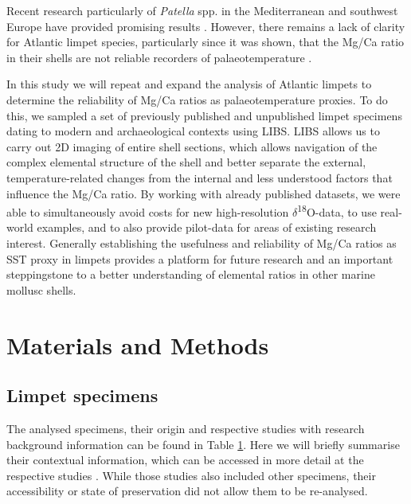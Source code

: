 \documentclass[
  authoryear,
  preprint,
  3p]{elsarticle}
\begin{document}
Recent research particularly of \emph{Patella} spp. in the Mediterranean
and southwest Europe have provided promising results
\citep{Hausmann2019-fi, Garcia-Escarzaga2015-jc, Garcia-Escarzaga2018-nf}.
However, there remains a lack of clarity for Atlantic limpet species,
particularly since it was shown, that the Mg/Ca ratio in their shells
are not reliable recorders of palaeotemperature \citep{Graniero2017-io}.

In this study we will repeat and expand the analysis of Atlantic limpets
to determine the reliability of Mg/Ca ratios as palaeotemperature
proxies. To do this, we sampled a set of previously published and
unpublished limpet specimens dating to modern and archaeological
contexts using LIBS. LIBS allows us to carry out 2D imaging of entire
shell sections, which allows navigation of the complex elemental
structure of the shell and better separate the external,
temperature-related changes from the internal and less understood
factors that influence the Mg/Ca ratio. By working with already
published datasets, we were able to simultaneously avoid costs for new
high-resolution $\delta$\textsuperscript{18}O-data, to use real-world
examples, and to also provide pilot-data for areas of existing research
interest. Generally establishing the usefulness and reliability of Mg/Ca
ratios as SST proxy in limpets provides a platform for future research
and an important steppingstone to a better understanding of elemental
ratios in other marine mollusc shells.

\section{Materials and Methods}\label{Methods}

\subsection{Limpet specimens}\label{limpet-specimens}

The analysed specimens, their origin and respective studies with
research background information can be found in Table
\hyperref[Table_1]{1}. Here we will briefly summarise their contextual
information, which can be accessed in more detail at the respective
studies \citep{Nicastro2020-ih, Surge2012-ba, Graniero2017-io}. While
those studies also included other specimens, their accessibility or
state of preservation did not allow them to be re-analysed.

\label{Table_1}
\fontsize{8pt}{8pt}\selectfont
\end{document}
